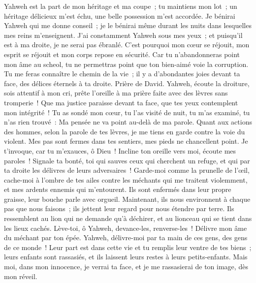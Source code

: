 \begin{multicols}{2}
Yahweh est la part de mon héritage et ma coupe~; tu maintiens mon lot~;
un héritage délicieux m'est échu, une belle possession m'est accordée.
Je bénirai Yahweh qui me donne conseil~; je le bénirai même durant les nuits dans lesquelles mes reins m'enseignent.
J'ai constamment Yahweh sous mes yeux~; et puisqu'il est à ma droite, je ne serai pas ébranlé.
C'est pourquoi mon cœur se réjouit, mon esprit se réjouit et mon corps repose en sécurité.
Car tu n'abandonneras point mon âme au scheol, tu ne permettras point que ton bien-aimé voie la corruption.
Tu me feras connaître le chemin de la vie~; il y a d'abondantes joies devant ta face, des délices éternels à ta droite.
\VerseOne{}Prière de David. Yahweh, écoute la droiture, sois attentif à mon cri, prête l'oreille à ma prière faite avec des lèvres sans tromperie~!
Que ma justice paraisse devant ta face, que tes yeux contemplent mon intégrité~!
Tu as sondé mon cœur, tu l'as visité de nuit, tu m'as examiné, tu n'as rien trouvé~: Ma pensée ne va point au-delà de ma parole.
Quant aux actions des hommes, selon la parole de tes lèvres, je me tiens en garde contre la voie du violent.
Mes pas sont fermes dans tes sentiers, mes pieds ne chancellent point.
Je t'invoque, car tu m'exauces, ô Dieu~! Incline ton oreille vers moi, écoute mes paroles~!
Signale ta bonté, toi qui sauves ceux qui cherchent un refuge, et qui par ta droite les délivres de leurs adversaires~!
Garde-moi comme la prunelle de l'œil, cache-moi à l'ombre de tes ailes
contre les méchants qui me traitent violemment, et mes ardents ennemis qui m'entourent.
Ils sont enfermés dans leur propre graisse, leur bouche parle avec orgueil.
Maintenant, ils nous environnent à chaque pas que nous faisons~; ils jettent leur regard pour nous étendre par terre.
Ils ressemblent au lion qui ne demande qu'à déchirer, et au lionceau qui se tient dans les lieux cachés.
Lève-toi, ô Yahweh, devance-les, renverse-les~! Délivre mon âme du méchant par ton épée.
Yahweh, délivre-moi par ta main de ces gens, des gens de ce monde~! Leur part est dans cette vie et tu remplis leur ventre de tes biens~; leurs enfants sont rassasiés, et ils laissent leurs restes à leurs petits-enfants.
Mais moi, dans mon innocence, je verrai ta face, et je me rassasierai de ton image, dès mon réveil.

\end{multicols}
